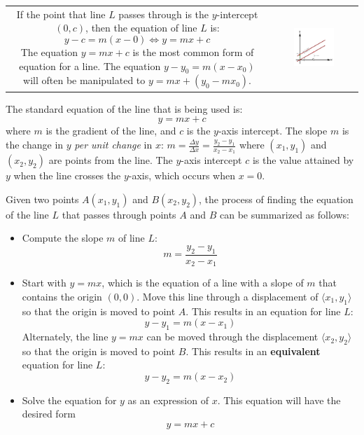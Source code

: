 \documentclass{article}
\begin{document}
\begin{tabular}{cc}
\parbox{0.5\textwidth}{
If the point that line \(L\) passes through is the \(y\)-intercept \((0, c)\), then the equation of line \(L\) is:
\[y - c = m(x - 0) \iff y = mx + c\]
The equation \(y = mx + c\) is the most common form of equation for a line. The equation \(y - y_0 = m(x - x_0)\) will often be manipulated to \(y = mx + (y_0 - mx_0)\).
} & \parbox{0.5\textwidth}{
\includegraphics[width = 0.5\textwidth]{gradient_4}
}
\end{tabular}

The standard equation of the line that is being used is:
\[y = mx + c\]
where \(m\) is the gradient of the line, and \(c\) is the \(y\)-axis intercept. The slope \(m\) is the change in \(y\) \emph{per unit change} in \(x\): \(m = \frac{\Delta y}{\Delta x} = \frac{y_2 - y_1}{x_2 - x_1}\) where \((x_1, y_1)\) and \((x_2, y_2)\) are points from the line. The \(y\)-axis intercept \(c\) is the value attained by \(y\) when the line crosses the \(y\)-axis, which occurs when \(x = 0\). 

Given two points \(A(x_1, y_1)\) and \(B(x_2, y_2)\), the process of finding the equation of the line \(L\) that passes through points \(A\) and \(B\) can be summarized as follows: 
\begin{itemize}
\item Compute the slope \(m\) of line \(L\): 
\[m = \frac{y_2 - y_1}{x_2 - x_1}\]
\item Start with \(y = mx\), which is the equation of a line with a slope of \(m\) that contains the origin \((0, 0)\). Move this line through a displacement of \(\langle x_1, y_1 \rangle\) so that the origin is moved to point \(A\). This results in an equation for line \(L\):
\[y - y_1 = m(x - x_1)\]
Alternately, the line \(y = mx\) can be moved through the displacement \(\langle x_2, y_2 \rangle\) so that the origin is moved to point \(B\). This results in an {\bf equivalent} equation for line \(L\):
\[y - y_2 = m(x - x_2)\]
\item Solve the equation for \(y\) as an expression of \(x\). This equation will have the desired form 
\[y = mx + c\]
\end{itemize}
\end{document}
